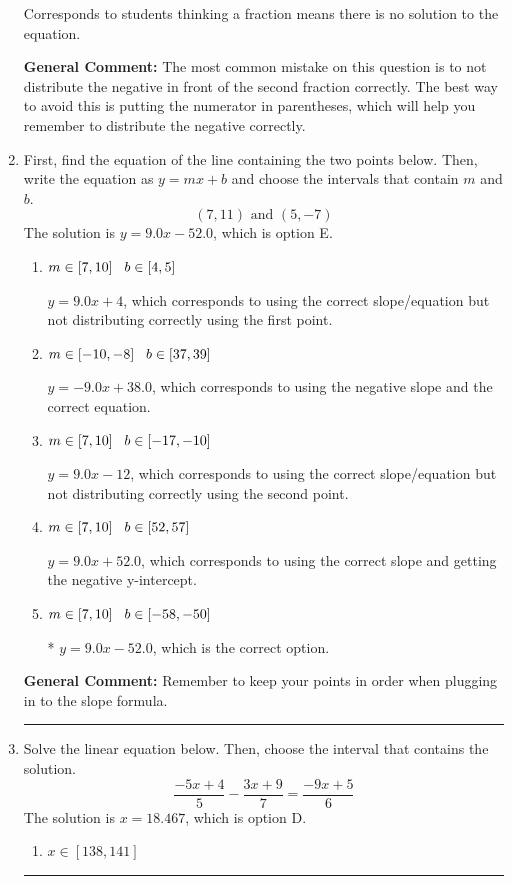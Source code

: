 \documentclass{extbook}[14pt]
\newcommand{\litem}[1]{\item #1

\rule{\textwidth}{0.4pt}}
\begin{document}
\begin{enumerate}
{\begin{enumerate}[label=\Alph*.]
Corresponds to students thinking a fraction means there is no solution to the equation.
\end{enumerate}

\textbf{General Comment:} The most common mistake on this question is to not distribute the negative in front of the second fraction correctly. The best way to avoid this is putting the numerator in parentheses, which will help you remember to distribute the negative correctly.
}
\litem{
First, find the equation of the line containing the two points below. Then, write the equation as $ y=mx+b $ and choose the intervals that contain $m$ and $b$.
\[ (7, 11) \text{ and } (5, -7) \]The solution is \( y = 9.0x -52.0 \), which is option E.\begin{enumerate}[label=\Alph*.]
\item \( m \in [7, 10] \hspace*{3mm} b \in [4, 5] \)

 $y = 9.0x + 4$, which corresponds to using the correct slope/equation but not distributing correctly using the first point.
\item \( m \in [-10, -8] \hspace*{3mm} b \in [37, 39] \)

 $y = -9.0x + 38.0$, which corresponds to using the negative slope and the correct equation.
\item \( m \in [7, 10] \hspace*{3mm} b \in [-17, -10] \)

 $y = 9.0x -12$, which corresponds to using the correct slope/equation but not distributing correctly using the second point.
\item \( m \in [7, 10] \hspace*{3mm} b \in [52, 57] \)

 $y = 9.0x + 52.0$, which corresponds to using the correct slope and getting the negative y-intercept.
\item \( m \in [7, 10] \hspace*{3mm} b \in [-58, -50] \)

* $y = 9.0x -52.0$, which is the correct option.
\end{enumerate}

\textbf{General Comment:} Remember to keep your points in order when plugging in to the slope formula.
}
\litem{
Solve the linear equation below. Then, choose the interval that contains the solution.
\[ \frac{-5x + 4}{5} - \frac{3x + 9}{7} = \frac{-9x + 5}{6} \]The solution is \( x = 18.467 \), which is option D.\begin{enumerate}[label=\Alph*.]
\item \( x \in [138, 141] \)


\end{enumerate}}
\end{enumerate}
\end{document}

